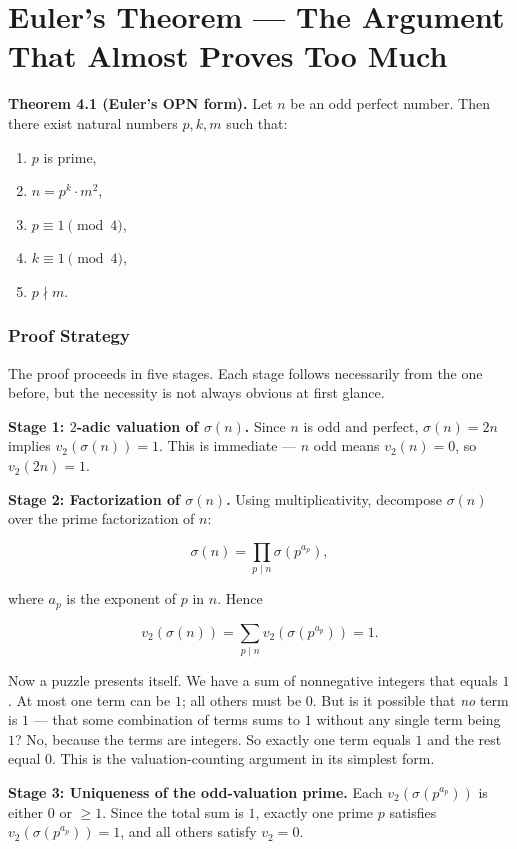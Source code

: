 \documentclass[11pt,a4paper]{article}
\begin{document}
\section{Euler's Theorem --- The Argument That Almost Proves Too Much}

\textbf{Theorem 4.1 (Euler's OPN form).} Let $n$ be an odd perfect number. Then there exist natural numbers $p, k, m$ such that:

\begin{enumerate}
    \item $p$ is prime,
    \item $n = p^k \cdot m^2$,
    \item $p \equiv 1 \pmod{4}$,
    \item $k \equiv 1 \pmod{4}$,
    \item $p \nmid m$.
\end{enumerate}

\subsubsection{Proof Strategy}

The proof proceeds in five stages. Each stage follows necessarily from the one before, but the necessity is not always obvious at first glance.

\textbf{Stage 1: $2$-adic valuation of $\sigma(n)$.} Since $n$ is odd and perfect, $\sigma(n) = 2n$ implies $v_2(\sigma(n)) = 1$. This is immediate --- $n$ odd means $v_2(n) = 0$, so $v_2(2n) = 1$.

\textbf{Stage 2: Factorization of $\sigma(n)$.} Using multiplicativity, decompose $\sigma(n)$ over the prime factorization of $n$:

\[\sigma(n) = \prod_{p \mid n} \sigma(p^{a_p}),\]

where $a_p$ is the exponent of $p$ in $n$. Hence

\[v_2(\sigma(n)) = \sum_{p \mid n} v_2(\sigma(p^{a_p})) = 1.\]

Now a puzzle presents itself. We have a sum of nonnegative integers that equals $1$. At most one term can be $1$; all others must be $0$. But is it possible that \emph{no} term is $1$ --- that some combination of terms sums to $1$ without any single term being $1$? No, because the terms are integers. So exactly one term equals $1$ and the rest equal $0$. This is the valuation-counting argument in its simplest form.

\textbf{Stage 3: Uniqueness of the odd-valuation prime.} Each $v_2(\sigma(p^{a_p}))$ is either $0$ or $\ge 1$. Since the total sum is $1$, exactly one prime $p$ satisfies $v_2(\sigma(p^{a_p})) = 1$, and all others satisfy $v_2 = 0$.
\end{document}
